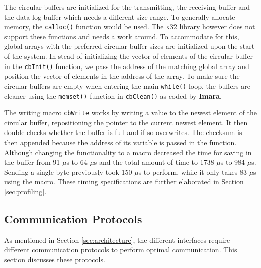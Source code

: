 \documentclass{article}
\begin{document}
The circular buffers are initialized for the transmitting, the receiving buffer and the data log buffer which needs a different size range. To generally allocate memory, the \texttt{calloc()} function would be used. The \textsc{x32} library however does not support these functions and needs a work around. To accommodate for this, global arrays with the preferred circular buffer sizes are initialized upon the start of the system. In stead of initializing the vector of elements of the circular buffer in the \texttt{cbInit()} function, we pass the address of the matching global array and position the vector of elements in the address of the array.  To make sure the circular buffers are empty when entering the main \texttt{while()} loop, the buffers are cleaner using the \texttt{memset()} function in \texttt{cbClean()} as coded by \textbf{Imara}.

The writing macro \texttt{cbWrite} works by writing a value to the newest element of the circular buffer, repositioning the pointer to the current newest element. It then double checks whether the buffer is full and if so overwrites. The checksum is then appended because the address of its variable is passed in the function. Although changing the functionality to a macro decreased the time for saving in the buffer from 91 $\mu$s to 64 $\mu$s and the total amount of time to 1738 $\mu$s to 984 $\mu$s. Sending a single byte previously took 150 $\mu$s to perform, while it only takes 83 $\mu$s using the macro. These timing specifications are further elaborated in Section \ref{sec:profiling}.

\subsection{Communication Protocols}
\label{sec:communication}
As mentioned in Section \ref{sec:architecture}, the different interfaces require different communication protocols to perform optimal communication. This section discusses these protocols. 

\end{document}
